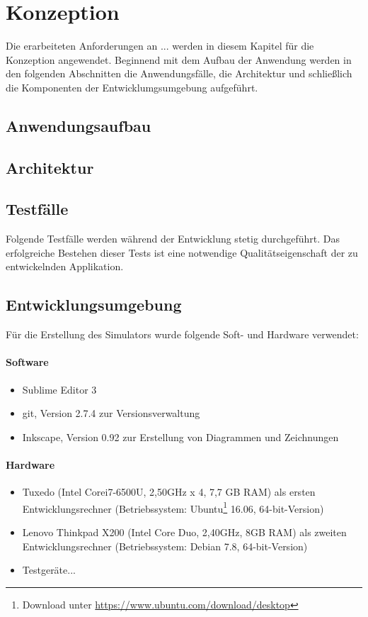 \chapter{\label{chap:konzeption}Konzeption}
Die erarbeiteten Anforderungen an ... werden in diesem Kapitel für die Konzeption angewendet.
Beginnend mit dem Aufbau der Anwendung werden in den folgenden Abschnitten die Anwendungsfälle,
die Architektur und schließlich die Komponenten der Entwicklumgsumgebung aufgeführt.
%
%
\section{Anwendungsaufbau}
%
%
\section{Architektur}
%
%
\section{Testfälle}
Folgende Testfälle werden während der Entwicklung stetig durchgeführt. Das erfolgreiche Bestehen dieser Tests ist eine notwendige Qualitätseigenschaft der zu entwickelnden Applikation.
%
%
\section{Entwicklungsumgebung}
Für die Erstellung des Simulators wurde folgende Soft- und Hardware verwendet:
\subsubsection{Software}
\begin{itemize}
  \item Sublime Editor 3
  \item git, Version 2.7.4 zur Versionsverwaltung
  \item Inkscape, Version 0.92 zur Erstellung von Diagrammen und Zeichnungen
\end{itemize}
\subsubsection{Hardware}
\begin{itemize}
  \item Tuxedo (Intel\textsuperscript{\textregistered} Core\tm i7-6500U, 2,50GHz x 4, 7,7 GB RAM) als ersten Entwicklungsrechner
        (Betriebssystem: Ubuntu\footnote{ Download unter \url{https://www.ubuntu.com/download/desktop}} 16.06, 64-bit-Version)
  \item Lenovo Thinkpad X200 (Intel\textsuperscript{\textregistered} Core Duo, 2,40GHz, 8GB RAM) als zweiten Entwicklungsrechner (Betriebssystem: Debian 7.8, 64-bit-Version)
  \item Testgeräte...
\end{itemize}
